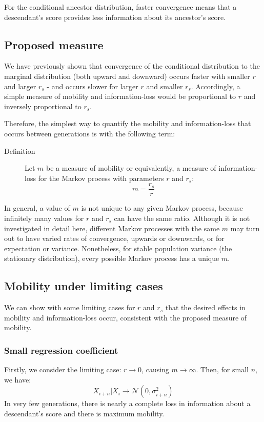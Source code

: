 \documentclass[a4paper,11pt]{article} %
\begin{document}
For the conditional ancestor distribution, faster convergence means that a descendant's score provides less information about its ancestor's score. 

\subsection{Proposed measure}
We have previously shown that convergence of the conditional distribution to the marginal distribution (both upward and downward) occurs faster with smaller $r$ and larger $r_s$ - and occurs slower for larger $r$ and smaller $r_s$. Accordingly, a simple measure of mobility and information-loss would be proportional to $r$ and inversely proportional to $r_s$. 

Therefore, the simplest way to quantify the mobility and information-loss that occurs between generations is with the following term:

\begin{description}
\item [Definition] Let $m$ be a measure of mobility or equivalently, a measure of information-loss for the Markov process with parameters $r$ and $r_s$:
$$m = \frac{r_s}{r}$$
\end{description}

In general, a value of $m$ is not unique to any given Markov process, because infinitely many values for $r$ and $r_s$ can have the same ratio. Although it is not investigated in detail here, different Markov processes with the same $m$ may turn out to have varied rates of convergence, upwards or downwards, or for expectation or variance. Nonetheless, for stable population variance (the stationary distribution), every possible Markov process has a unique $m$. 


\subsection{Mobility under limiting cases}

We can show with some limiting cases for $r$ and $r_s$ that the desired effects in mobility and information-loss occur, consistent with the proposed measure of mobility. 

\subsubsection*{Small regression coefficient}
Firstly, we consider the limiting case: $r \rightarrow 0$, causing $m \rightarrow \infty$. Then, for small $n$, we have:
$$X_{i+n}|X_i \rightarrow \mathcal{N}(0, \sigma_{i+n}^2)$$
In very few generations, there is nearly a complete loss in information about a descendant's score and there is maximum mobility. 
\end{document}
